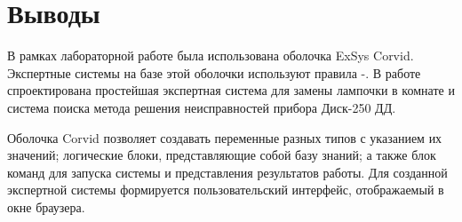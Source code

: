 \section{Выводы}

В рамках лабораторной работе была использована оболочка ExSys Corvid. Экспертные системы на базе этой оболочки используют правила -. В работе спроектирована простейшая экспертная система для замены лампочки в комнате и система поиска метода решения неисправностей прибора Диск-250 ДД.

Оболочка Corvid позволяет создавать переменные разных типов с указанием их значений; логические блоки, представляющие собой базу знаний; а также блок команд для запуска системы и представления результатов работы. Для созданной экспертной системы формируется пользовательский интерфейс, отображаемый в окне браузера.





